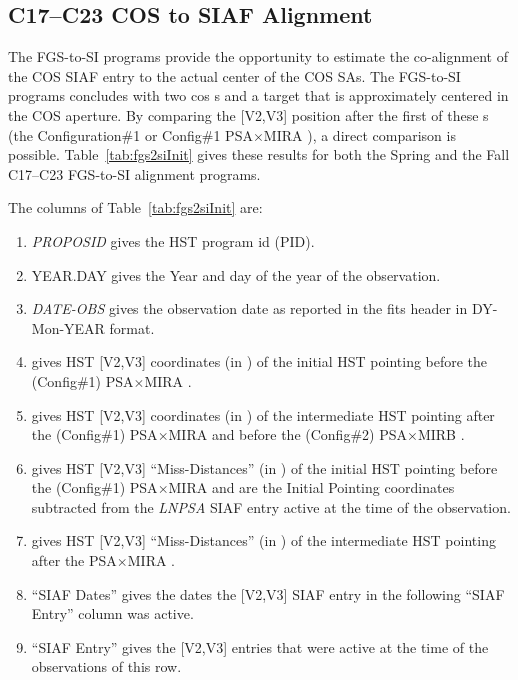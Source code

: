 \subsection{C17--C23 COS to SIAF Alignment \label{subsec:siafalign}}

The FGS-to-SI programs provide the opportunity to estimate the co-alignment
of the COS SIAF entry to the actual center of the COS SAs. The FGS-to-SI programs
concludes with two cos s and a target that is approximately centered in the COS
aperture. By comparing the [V2,V3] position after the first of these s
(the Configuration\#1 or Config\#1 PSA$\times$MIRA ), a direct comparison is possible.
Table~\ref{tab:fgs2siInit} gives these results for both the Spring and the Fall C17--C23 FGS-to-SI alignment programs.

The columns of Table~\ref{tab:fgs2siInit} are:
\footnotesize
\begin{enumerate}
\item \textit{PROPOSID} gives the HST program id (PID).
\item YEAR.DAY gives the Year and day of the year of the observation.
\item \textit{DATE-OBS} gives the observation date as reported in the
fits header in DY-Mon-YEAR format.
\item gives HST [V2,V3] coordinates (in \arcsec) of
the initial HST pointing before the (Config\#1) PSA$\times$MIRA .
\item gives HST [V2,V3] coordinates (in \arcsec) of
the intermediate HST pointing after the (Config\#1) PSA$\times$MIRA 
and before the (Config\#2) PSA$\times$MIRB .
\item gives HST [V2,V3] ``Miss-Distances'' (in \arcsec) of
the initial HST pointing before the (Config\#1) PSA$\times$MIRA 
and are the Initial Pointing coordinates subtracted from the \textit{LNPSA}
SIAF entry active at the time of the observation.
\item gives HST [V2,V3] ``Miss-Distances'' (in \arcsec) of
the intermediate HST pointing after the PSA$\times$MIRA .
\item ``SIAF Dates'' gives the dates the [V2,V3] SIAF entry in the following ``SIAF Entry'' column was active.
\item ``SIAF Entry'' gives the [V2,V3] entries that were active at the time
of the observations of this row.
\end{enumerate}
\normalsize


